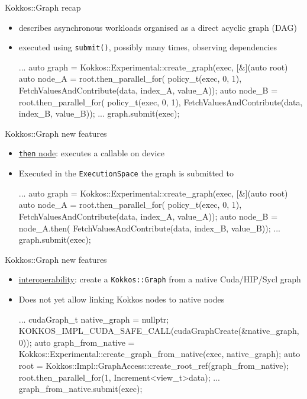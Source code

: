 \begin{frame}[fragile]{Kokkos::Graph recap}
 \begin{itemize}
     \item describes asynchronous workloads organised as a direct acyclic graph (DAG)
     \item executed using \texttt{submit()}, possibly many times, observing dependencies
      \begin{code}[keywords={auto}]
    ...
    auto graph = Kokkos::Experimental::create_graph(exec, [&](auto root) {
      auto node_A = root.then_parallel_for(
                    policy_t(exec, 0, 1),
                    FetchValuesAndContribute(data, index_A, value_A));
      auto node_B = root.then_parallel_for(
                    policy_t(exec, 0, 1),
                    FetchValuesAndContribute(data, index_B, value_B));}
    ...
    graph.submit(exec);
     \end{code}
 \end{itemize}
\end{frame}

\begin{frame}[fragile]{Kokkos::Graph new features}
 \begin{itemize}
  \item \href{https://github.com/kokkos/kokkos/pull/7629}{\texttt{then} node}: executes a callable on device
   \item Executed in the \texttt{ExecutionSpace} the graph is submitted to
     \begin{code}[keywords={auto}]
    ...
    auto graph = Kokkos::Experimental::create_graph(exec, [&](auto root) {
      auto node_A = root.then_parallel_for(
                    policy_t(exec, 0, 1),
                    FetchValuesAndContribute(data, index_A, value_A));
      auto node_B = node_A.then(
                    FetchValuesAndContribute(data, index_B, value_B));}
    ...
    graph.submit(exec);
     \end{code}
 \end{itemize}
\end{frame}

\begin{frame}[fragile]{Kokkos::Graph new features}
 \begin{itemize}
   \item \href{https://github.com/kokkos/kokkos/pull/7664}{interoperability}: create a \texttt{Kokkos::Graph} from a native Cuda/HIP/Sycl graph
   \item Does not yet allow linking Kokkos nodes to native nodes
     \begin{code}[keywords={auto}]
    ...
    cudaGraph_t native_graph = nullptr;
    KOKKOS_IMPL_CUDA_SAFE_CALL(cudaGraphCreate(&native_graph, 0));
    auto graph_from_native =
      Kokkos::Experimental::create_graph_from_native(exec, native_graph);
    auto root = Kokkos::Impl::GraphAccess::create_root_ref(graph_from_native);
    root.then_parallel_for(1, Increment<view_t>{data});
    ...
    graph_from_native.submit(exec);
     \end{code}
 \end{itemize}
\end{frame}

